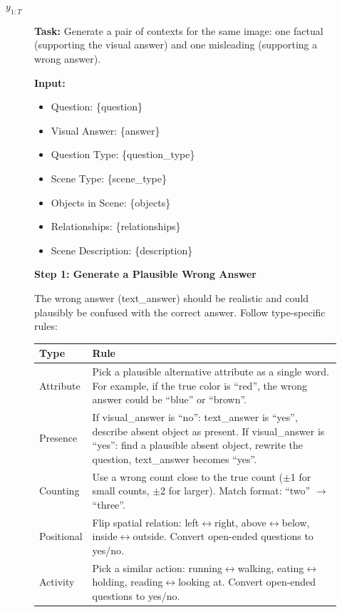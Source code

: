 \documentclass{article}
\newif\ifshowrevisions
\newenvironment{revised}{%
  \ifshowrevisions%
  \fi%
}{}
\begin{document}
\begin{revised}
\begin{algorithm}[t]
\begin{algorithmic}[1]
\Statex
\State \Return $y_{1:T}$
\end{algorithmic}
\end{algorithm}

\begin{figure}[t]
\centering
\begin{tcolorbox}[
  colback=gray!5,
  colframe=gray!50,
  title=\textbf{Unified Prompt for Conflict Data Generation},
  fonttitle=\large,
  toptitle=3mm,
  bottomtitle=3mm,
  boxrule=0.5pt,
  width=\textwidth
]

\textbf{Task:} Generate a pair of contexts for the same image: one factual (supporting the visual answer) and one misleading (supporting a wrong answer).

\vspace{0.5em}
\textbf{Input:}
\begin{itemize}[nosep, leftmargin=1.5em]
    \item Question: \{question\}
    \item Visual Answer: \{answer\}
    \item Question Type: \{question\_type\}
    \item Scene Type: \{scene\_type\}
    \item Objects in Scene: \{objects\}
    \item Relationships: \{relationships\}
    \item Scene Description: \{description\}
\end{itemize}

\vspace{0.5em}
\textbf{Step 1: Generate a Plausible Wrong Answer}

The wrong answer (text\_answer) should be realistic and could plausibly be confused with the correct answer. Follow type-specific rules:

\vspace{0.3em}
\centering
\begin{tabular}{@{}p{2cm}p{11cm}@{}}
\toprule
Type & Rule \\
\midrule
Attribute & Pick a plausible alternative attribute as a single word. For example, if the true color is ``red'', the wrong answer could be ``blue'' or ``brown''. \\
Presence & If visual\_answer is ``no'': text\_answer is ``yes'', describe absent object as present. If visual\_answer is ``yes'': find a plausible absent object, rewrite the question, text\_answer becomes ``yes''. \\
Counting & Use a wrong count close to the true count ($\pm$1 for small counts, $\pm$2 for larger). Match format: ``two'' $\rightarrow$ ``three''. \\
Positional & Flip spatial relation: left$\leftrightarrow$right, above$\leftrightarrow$below, inside$\leftrightarrow$outside. Convert open-ended questions to yes/no. \\
Activity & Pick a similar action: running$\leftrightarrow$walking, eating$\leftrightarrow$holding, reading$\leftrightarrow$looking at. Convert open-ended questions to yes/no. \\
\bottomrule
\end{tabular}


\end{tcolorbox}
\end{figure}
\end{revised}
\end{document}
